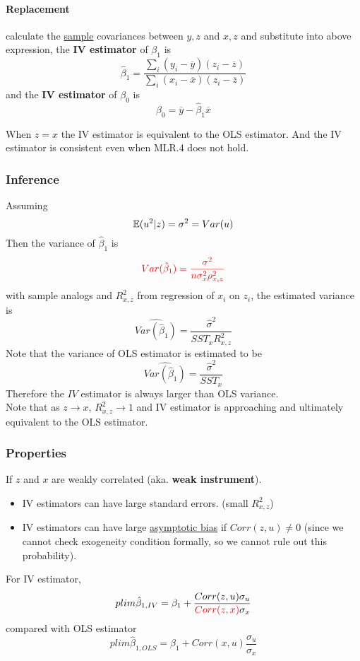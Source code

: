 \documentclass[]{article}
\begin{document}
				\paragraph{Replacement} calculate the \ul{sample} covariances between $y,z$ and $x,z$ and substitute into above expression, the \textbf{IV estimator} of $\beta_1$ is
				\[
					\hat{\beta}_1 = \frac{\sum_i (y_i - \overline{y})(z_i - \overline{z})}{\sum_i(x_i - \overline{x})(z_i - \overline{z})} 
				\]
				and the \textbf{IV estimator} of $\beta_0$ is 
				\[
					\hat{\beta}_0 = \overline{y} - \hat{\beta}_1 \overline{x}
				\]
				\begin{remark}
					When $z=x$ the IV estimator is equivalent to the OLS estimator. And the IV estimator is consistent even when MLR.4 does not hold.
				\end{remark}
			\subsubsection{Inference}
				Assuming 
				\[
					\mathbb{E}({u^2|z})=\sigma^2=Var(u)
				\]
				Then the variance of $\hat{\beta}_1$ is 
				\[
				\textcolor{red}{
					Var(\hat{\beta}_1) = \frac{\sigma^2}{n\sigma_x^2 \rho_{x,z}^2}
				}
				\]
				with sample analogs and $R^2_{x,z}$ from regression of $x_i$ on $z_i$, the estimated variance is 
				\[
					\widehat{Var(\hat{\beta}_1)} = \frac{\hat{\sigma}^2}{SST_x R^2_{x,z}}
				\]
				Note that the variance of OLS estimator is estimated to be
				\[
					\widehat{Var(\hat{\beta}_1)} = \frac{\hat{\sigma}^2}{SST_x}
				\]
				Therefore the $IV$ estimator is always larger than OLS variance. \\
				Note that as $z \to x$, $R^2_{x,z} \to 1$ and IV estimator is approaching and ultimately equivalent to the OLS estimator.
			\subsubsection{Properties}
				If $z$ and $x$ are weakly correlated (aka. \textbf{weak instrument}).
				\begin{itemize}
					\item IV estimators can have large standard errors. (small $R^2_{x,z}$)
					\item IV estimators can have large \ul{asymptotic bias} if $Corr(z,u) \neq 0$ (since we cannot check exogeneity condition formally, so we cannot rule out this probability).
				\end{itemize}
				For IV estimator,
				\[
					plim \hat{\beta}_{1, IV} = \beta_1 + \frac{Corr(z,u) \sigma_u}{\textcolor{red}{Corr(z,x)} \sigma_x}
				\]
				compared with OLS estimator
				\[
					plim \hat{\beta}_{1,OLS} = \beta_1 + Corr(x,u) \frac{\sigma_u}{\sigma_x}
				\]
				
\end{document}
